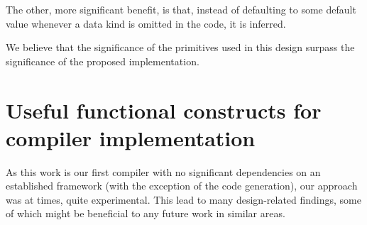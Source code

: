 The other, more significant benefit, is that, instead of defaulting to some default value whenever a data kind is omitted in the \cmm code, it is inferred.

We believe that the significance of the primitives used in this design surpass the significance of the proposed implementation. 




\section{Useful functional constructs for compiler implementation}

As this work is our first compiler with no significant dependencies on an established framework (with the exception of the code generation), our approach was at times, quite experimental. This lead to many design-related findings, some of which might be beneficial to any future work in similar areas.

